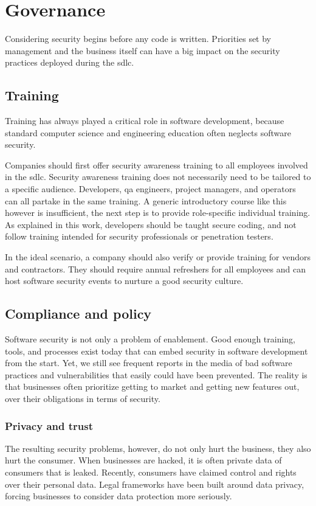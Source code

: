 \section{Governance}
\label{sec:related-plan}
Considering security begins before any code is written.
Priorities set by management and the business itself can have a big impact on the security practices deployed during the \gls{sdlc}.

\subsection{Training}
Training has always played a critical role in software development, because standard computer science and engineering education often neglects software security.

Companies should first offer security awareness training to all employees involved in the \gls{sdlc}.
Security awareness training does not necessarily need to be tailored to a specific audience.
Developers, \gls{qa} engineers, project managers, and operators can all partake in the same training.
A generic introductory course like this however is insufficient, the next step is to provide role-specific individual training.
As explained in this work, developers should be taught secure coding, and not follow training intended for security professionals or penetration testers.

In the ideal scenario, a company should also verify or provide training for vendors and contractors.
They should require annual refreshers for all employees and can host software security events to nurture a good security culture.

\subsection{Compliance and policy}
Software security is not only a problem of enablement.
Good enough training, tools, and processes exist today that can embed security in software development from the start.
Yet, we still see frequent reports in the media of bad software practices and vulnerabilities that easily could have been prevented.
The reality is that businesses often prioritize getting to market and getting new features out, over their obligations in terms of security.

\subsubsection{Privacy and trust}
The resulting security problems, however, do not only hurt the business, they also hurt the consumer.
When businesses are hacked, it is often private data of consumers that is leaked.
Recently, consumers have claimed control and rights over their personal data.
Legal frameworks have been built around data privacy, forcing businesses to consider data protection more seriously.

